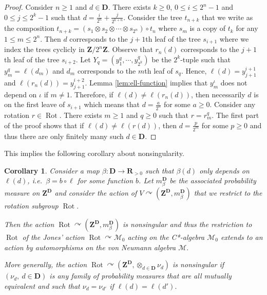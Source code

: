 \documentclass[a4paper,12pt]{amsart}
\numberwithin{equation}{section}
\newtheorem{corollary}[theo]{Corollary}
\theoremstyle{definition}
\newcommand{\act}{\curvearrowright}
\newcommand{\D}{\mathbf D}
\newcommand{\scrM}{\mathscr M}
\newcommand{\mbD}{m_\beta^\D}
\newcommand{\ot}{\otimes}\newcommand{\otmin}{\otimes_{\text{min}}}
\newcommand{\R}{\mathbf{R}}
\DeclareMathOperator{\Rot}{Rot}
\newcommand{\Z}{\mathbf{Z}}
\begin{document}
\begin{proof}
Consider $n\geq 1$ and $d\in \D$.
There exists $k\geq 0$,  $0\leq i\leq 2^n -1$ and $0\leq j\leq 2^k-1$ such that $d = \tfrac{i}{2^n} + \tfrac{j}{2^{k+n}}.$
Consider the tree $t_{n+k}$ that we write as the composition $t_{n+k} = (s_1\ot s_2\ot\cdots \ot s_{2^n}) \circ t_n$ where $s_m$ is a copy of $t_k$ for any $1\leq m\leq 2^n.$
Then $d$ corresponds to the $j+1$th leaf of the tree $s_{i+1}$ where we index the trees cyclicly in $\Z/2^n\Z$. 
Observe that $r_n(d)$ corresponds to the $j+1$th leaf of the tree $s_{i+2}$.
Let $Y_q=(y_1^q,\cdots, y_{2^k}^q)$ be the $2^k$-tuple such that $y_m^q=\ell(d_m)$ and $d_m$ corresponds to the $m$th leaf of $s_q$.
Hence, $\ell(d) = y_{j+1}^{i+1}$ and $\ell(r_n(d)) = y_{j+1}^{i+2}.$
Lemma \ref{lem:ell-function} implies that $y_{m}^\iota$ does not depend on $\iota$ if $m\neq 1.$
Therefore, if $\ell(d)\neq \ell(r_n(d))$, then necessarily $d$ is on the first leave of $s_{i+1}$ which means that $d=\tfrac{a}{2^n}$ for some $a\geq 0.$
Consider any rotation $r\in \Rot$. 
There exists $m\geq 1$ and $q\geq 0$ such that $r= r_m^q$.
The first part of the proof shows that if $\ell(d)\neq \ell(r(d))$, then $d=\tfrac{p}{2^m}$ for some $p\geq 0$ and thus there are only finitely many such $d\in \D.$
\end{proof}

This implies the following corollary about nonsingularity.

\begin{corollary}\label{cor:Rot}
Consider a map $\beta:\D\to\R_{>0}$ such that $\beta(d)$ only depends on $\ell(d)$, i.e.~$\beta=b\circ\ell$ for some function $b$.
Let $\mbD$ be the associated probability measure on $\Z^\D$ and consider the action of $V\act (\Z^\D,\mbD)$ that we restrict to the rotation subgroup $\Rot$.

Then the action $\Rot\act (\Z^\D,\mbD)$ is nonsingular and thus the restriction to $\Rot$ of the Jones' action $\Rot\act \scrM_0$ acting on the C*-algebra $\scrM_0$ extends to an action by automorphisms on the von Neumann algebra $\scrM.$

More generally, the action $\Rot\act (\Z^\D, \otimes_{d\in\D} \nu_d)$ is nonsingular if $(\nu_d,\ d\in\D)$ is any family of probability measures that are all mutually equivalent and such that $\nu_d = \nu_{d'}$ if $\ell(d)=\ell(d').$
\end{corollary}
\end{document}

